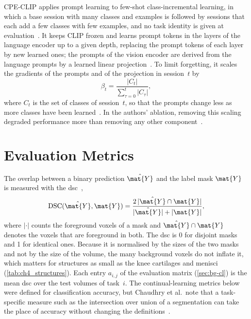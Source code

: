 CPE-CLIP applies prompt learning to few-shot class-incremental learning, in which a base session with many classes and examples is followed by sessions that each add a few classes with few examples, and no task identity is given at evaluation~\cite[Sec.~1, 3]{D_Alessandro_2023}.
It keeps CLIP frozen and learns prompt tokens in the layers of the language encoder up to a given depth, replacing the prompt tokens of each layer by new learned ones; the prompts of the vision encoder are derived from the language prompts by a learned linear projection~\cite[Sec.~4, Eqs.~2--8]{D_Alessandro_2023}.
To limit forgetting, it scales the gradients of the prompts and of the projection in session~$t$ by
\begin{equation}
\beta_t = \frac{|C_t|}{\sum_{\tau=0}^{t} |C_\tau|},
\label{eq:bg-cpe-scaling}
\end{equation}
where $C_t$ is the set of classes of session~$t$, so that the prompts change less as more classes have been learned~\cite[Sec.~4, Eqs.~11--13]{D_Alessandro_2023}.
In the authors' ablation, removing this scaling degraded performance more than removing any other component~\cite[Sec.~5.5, Fig.~2]{D_Alessandro_2023}.

\section{Evaluation Metrics}
\label{sec:bg-metrics}

The overlap between a binary prediction $\hat{\mat{Y}}$ and the label mask $\mat{Y}$ is measured with the \gls{dsc}~\cite{dice1945measures},
\begin{equation}
\operatorname{DSC}(\hat{\mat{Y}}, \mat{Y}) = \frac{2\,|\hat{\mat{Y}} \cap \mat{Y}|}{|\hat{\mat{Y}}| + |\mat{Y}|},
\label{eq:bg-dsc}
\end{equation}
where $|\cdot|$ counts the foreground voxels of a mask and $\hat{\mat{Y}} \cap \mat{Y}$ denotes the voxels that are foreground in both.
The \gls{dsc} is 0 for disjoint masks and 1 for identical ones.
Because it is normalised by the sizes of the two masks and not by the size of the volume, the many background voxels do not inflate it, which matters for structures as small as the knee cartilages and menisci (\cref{tab:ch4_structures}).
Each entry $a_{i,j}$ of the evaluation matrix (\cref{sec:bg-cl}) is the mean \gls{dsc} over the test volumes of task~$i$.
The continual-learning metrics below were defined for classification accuracy, but Chaudhry et al.\ note that a task-specific measure such as the intersection over union of a segmentation can take the place of accuracy without changing the definitions~\cite[Sec.~3]{Chaudhry_2018}.

